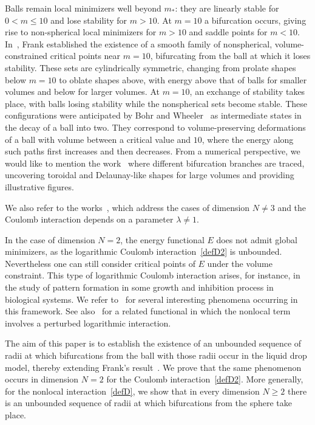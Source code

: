 \documentclass[10pt,reqno,english]{amsart}
\theoremstyle{definition}
\numberwithin{equation}{section}
\begin{document}
Balls remain local minimizers well beyond $m_*$: they are linearly stable for $0<m\le 10$ and lose stability for $m>10$. At $m=10$  a bifurcation occurs, giving rise to non-spherical local minimizers for $m>10$ and saddle points for $m<10$. In~\cite{Fr19}, Frank established the existence of a smooth family of nonspherical, volume-constrained critical points near $m=10$, bifurcating from the ball at which it loses stability.  These sets are cylindrically symmetric, changing from prolate shapes below $m=10$ to oblate shapes above, with energy above that of balls for smaller volumes and below for larger volumes. At $m=10$, an exchange of stability takes place, with balls losing stability while the nonspherical sets become stable.
These configurations were anticipated by Bohr and Wheeler~\cite{BohrWheeler1939} as intermediate states in the decay of a ball into two. They correspond to volume-preserving deformations of a ball with volume between a critical value and $10$, where the energy along such paths first increases and then decreases. 
From a numerical perspective, we would like to mention the work~\cite{XuDu2023} where different bifurcation branches are traced, uncovering toroidal and Delaunay-like shapes for large volumes and providing illustrative figures.

 
We also refer to the works~\cite{FigalliFuscoMaggiMillotMorini2015,KM14}, which address the cases of dimension $N\not= 3$ and the Coulomb interaction depends on a parameter $\lambda\not= 1$.

\medskip



In the case of dimension $N=2$, the energy functional $E$ does not admit global minimizers, as the logarithmic Coulomb interaction~\eqref{defD2} is unbounded. Nevertheless
one can still consider critical points of $E$ under the volume constraint. This type of 
 logarithmic Coulomb interaction arises, for instance, in the study of pattern formation in some growth and inhibition process in biological systems. We refer to~\cite{RZ25} for several interesting phenomena occurring in this framework.
See also~\cite{RWW25} for a related functional in which the nonlocal term involves a perturbed logarithmic interaction.


\vspace{20pt}
 
The aim of this paper is to establish the existence of an unbounded sequence of radii at which bifurcations from the ball with those radii occur in the liquid drop model, thereby extending Frank's result~\cite{Fr19}. We prove that the same phenomenon occurs in dimension $N=2$ for the Coulomb interaction~\eqref{defD2}. More generally, for the nonlocal interaction~\eqref{defD}, we show that in every dimension $N\ge 2$ there is an unbounded sequence of radii at which bifurcations from the sphere take place.
\end{document}
